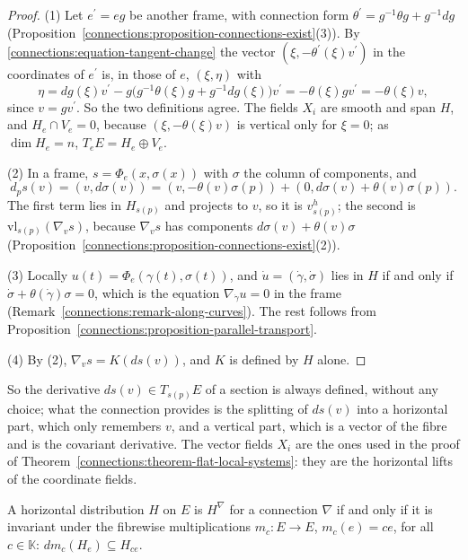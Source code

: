 \begin{proof}
(1) Let $e^{\prime} = eg$ be another frame, with connection form $\theta^{\prime} = g^{-1}\theta g + g^{-1}dg$ (Proposition~\ref{connections:proposition-connections-exist}(3)). By
\eqref{connections:equation-tangent-change} the vector $(\xi, -\theta^{\prime}(\xi)v^{\prime})$ in the coordinates of $e^{\prime}$ is, in those of $e$, $(\xi, \eta)$ with
\[
\eta = dg(\xi)v^{\prime} - g\bigl(g^{-1}\theta(\xi)g + g^{-1}dg(\xi)\bigr)v^{\prime} = -\theta(\xi)gv^{\prime} = -\theta(\xi)v ,
\]
since $v = gv^{\prime}$. So the two definitions agree. The fields $X_i$ are smooth and span $H$, and $H_e \cap V_e = 0$, because $(\xi, -\theta(\xi)v)$ is vertical only for $\xi = 0$; as
$\dim H_e = n$, $T_eE = H_e \oplus V_e$.

(2) In a frame, $s = \Phi_e(x, \sigma(x))$ with $\sigma$ the column of components, and
\[
d_ps(v) = (v, d\sigma(v)) = (v, -\theta(v)\sigma(p)) + (0, d\sigma(v) + \theta(v)\sigma(p)).
\]
The first term lies in $H_{s(p)}$ and projects to $v$, so it is $v^h_{s(p)}$; the second is $\mathrm{vl}_{s(p)}(\nabla_vs)$, because $\nabla_vs$ has components $d\sigma(v) + \theta(v)\sigma$
(Proposition~\ref{connections:proposition-connections-exist}(2)).

(3) Locally $u(t) = \Phi_e(\gamma(t), \sigma(t))$, and $\dot u = (\dot\gamma, \dot\sigma)$ lies in $H$ if and only if $\dot\sigma + \theta(\dot\gamma)\sigma = 0$, which is the equation
$\nabla_{\dot\gamma}u = 0$ in the frame (Remark~\ref{connections:remark-along-curves}). The rest follows from Proposition~\ref{connections:proposition-parallel-transport}.

(4) By (2), $\nabla_vs = K(ds(v))$, and $K$ is defined by $H$ alone.
\end{proof}

So the derivative $ds(v) \in T_{s(p)}E$ of a section is always defined, without any choice; what the connection provides is the splitting of $ds(v)$ into a horizontal part, which only remembers
$v$, and a vertical part, which is a vector of the fibre and is the covariant derivative. The vector fields $X_i$ are the ones used in the proof of
Theorem~\ref{connections:theorem-flat-local-systems}: they are the horizontal lifts of the coordinate fields.

\begin{proposition}\label{connections:proposition-linear-horizontal}
A horizontal distribution $H$ on $E$ is $H^\nabla$ for a connection $\nabla$ if and only if it is invariant under the fibrewise multiplications $m_c \colon E \to E$, $m_c(e) = ce$, for all
$c \in \mathbb{K}$: $dm_c(H_e) \subseteq H_{ce}$.
\end{proposition}

